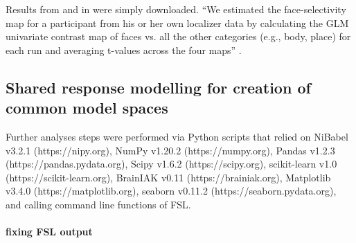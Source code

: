 


%
Results from \citet{sengupta2016extension} and in
\citet{haeusler2022processing} were simply downloaded.
%
``We estimated the face-selectivity map for a participant from his or her own
localizer data by calculating the GLM univariate contrast map of faces vs. all
the other categories (e.g., body, place) for each run and averaging t-values
across the four maps'' \citep{jiahui2020predicting}.


\subsection{Shared response modelling for creation of common model spaces}


Further analyses steps were performed via Python scripts that relied on
%
NiBabel v3.2.1 (https://nipy.org),
%
NumPy v1.20.2 (https://numpy.org),
%
Pandas v1.2.3 (https://pandas.pydata.org),
%
Scipy v1.6.2 (https://scipy.org),
%
scikit-learn v1.0 (https://scikit-learn.org),
%
BrainIAK v0.11 (https://brainiak.org),
%
Matplotlib v3.4.0 (https://matplotlib.org),
%
seaborn v0.11.2 (https://seaborn.pydata.org),
%
and calling command line functions of FSL.

\paragraph{fixing FSL output}




